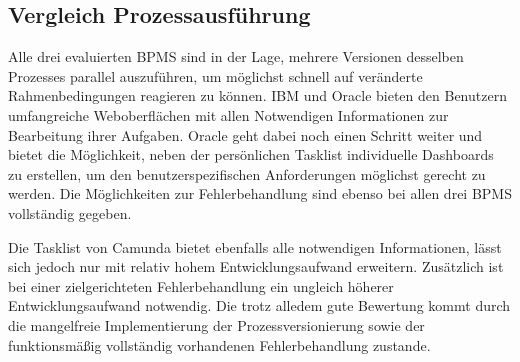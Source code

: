 
\subsection{Vergleich Prozessausführung}
Alle drei evaluierten \ac{BPMS} sind in der Lage, mehrere Versionen desselben Prozesses parallel auszuführen, um möglichst schnell auf veränderte Rahmenbedingungen reagieren zu können. IBM und Oracle bieten den Benutzern umfangreiche Weboberflächen mit allen Notwendigen Informationen zur Bearbeitung ihrer Aufgaben. Oracle geht dabei noch einen Schritt weiter und bietet die Möglichkeit, neben der persönlichen Tasklist individuelle Dashboards zu erstellen, um den benutzerspezifischen Anforderungen möglichst gerecht zu werden. Die Möglichkeiten zur Fehlerbehandlung sind ebenso bei allen drei \ac{BPMS} vollständig gegeben. 

\smallskip\noindent Die Tasklist von Camunda bietet ebenfalls alle notwendigen Informationen, lässt sich jedoch nur mit relativ hohem Entwicklungsaufwand erweitern. Zusätzlich ist bei einer zielgerichteten Fehlerbehandlung ein ungleich höherer Entwicklungsaufwand notwendig. Die trotz alledem gute Bewertung kommt durch die mangelfreie Implementierung der Prozessversionierung sowie der funktionsmäßig vollständig vorhandenen Fehlerbehandlung zustande. 


